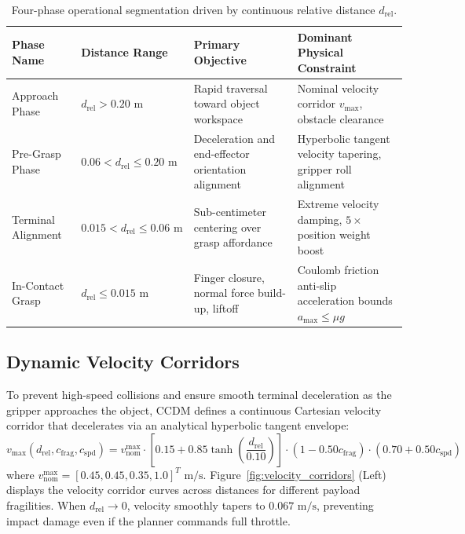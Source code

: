 \documentclass[10pt,a4paper]{article}
\begin{document}
\begin{table}[h]
\centering
\small
\begin{tabularx}{\linewidth}{p{2.8cm}p{2.6cm}p{4.2cm}X}
\toprule
\textbf{Phase Name} & \textbf{Distance Range} & \textbf{Primary Objective} & \textbf{Dominant Physical Constraint} \\
\midrule
Approach Phase & $d_{\mathrm{rel}} > 0.20\text{ m}$ & Rapid traversal toward object workspace & Nominal velocity corridor $v_{\mathrm{max}}$, obstacle clearance \\
Pre-Grasp Phase & $0.06 < d_{\mathrm{rel}} \le 0.20\text{ m}$ & Deceleration and end-effector orientation alignment & Hyperbolic tangent velocity tapering, gripper roll alignment \\
Terminal Alignment & $0.015 < d_{\mathrm{rel}} \le 0.06\text{ m}$ & Sub-centimeter centering over grasp affordance & Extreme velocity damping, $5\times$ position weight boost \\
In-Contact Grasp & $d_{\mathrm{rel}} \le 0.015\text{ m}$ & Finger closure, normal force build-up, liftoff & Coulomb friction anti-slip acceleration bounds $a_{\mathrm{max}} \le \mu g$ \\
\bottomrule
\end{tabularx}
\caption{Four-phase operational segmentation driven by continuous relative distance $d_{\mathrm{rel}}$.}
\label{tab:phase_segmentation}
\end{table}

\subsection{Dynamic Velocity Corridors}
To prevent high-speed collisions and ensure smooth terminal deceleration as the gripper approaches the object, CCDM defines a continuous Cartesian velocity corridor that decelerates via an analytical hyperbolic tangent envelope:
\begin{equation}
v_{\mathrm{max}}(d_{\mathrm{rel}}, c_{\mathrm{frag}}, c_{\mathrm{spd}}) = v_{\mathrm{nom}}^{\mathrm{max}} \cdot \left[0.15 + 0.85 \tanh\left(\frac{d_{\mathrm{rel}}}{0.10}\right)\right] \cdot \left(1 - 0.50 c_{\mathrm{frag}}\right) \cdot \left(0.70 + 0.50 c_{\mathrm{spd}}\right)
\label{eq:v_corridor}
\end{equation}
where $v_{\mathrm{nom}}^{\mathrm{max}} = [0.45, 0.45, 0.35, 1.0]^T\text{ m/s}$. Figure~\ref{fig:velocity_corridors} (Left) displays the velocity corridor curves across distances for different payload fragilities. When $d_{\mathrm{rel}} \rightarrow 0$, velocity smoothly tapers to $0.067\text{ m/s}$, preventing impact damage even if the planner commands full throttle.
\end{document}
